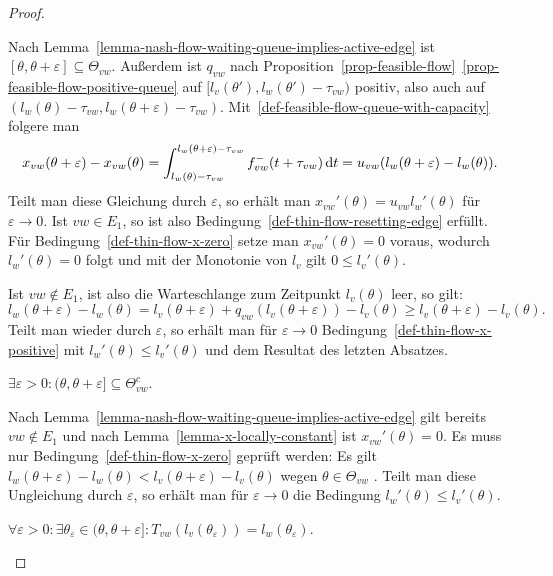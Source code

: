 \begin{proof}
\begin{description}[leftmargin=0cm, topsep=0cm, itemindent=0.5cm]
		Nach Lemma~\ref{lemma-nash-flow-waiting-queue-implies-active-edge} ist $[\theta,\theta+\varepsilon]\subseteq \Theta_{vw}$.
		Außerdem ist $q_{vw}$ nach Proposition~\ref{prop-feasible-flow}~\ref{prop-feasible-flow-positive-queue} auf $[ l_v(\theta') , l_w(\theta') - \tau_{vw} )$ positiv, also auch auf $( l_w(\theta)-\tau_{vw} , l_w(\theta + \varepsilon) - \tau_{vw} )$.
		Mit~\ref{def-feasible-flow-queue-with-capacity} folgere man
		\[ x_{vw}(\theta + \varepsilon) - x_{vw}(\theta) = \int_{l_w(\theta)-\tau_{vw}}^{l_w(\theta + \varepsilon)-\tau_{vw}} f_{vw}^-(t+\tau_{vw}) \mathop{}\!\mathrm{d} t
		= u_{vw} (l_w(\theta + \varepsilon) - l_w(\theta)).\]
		Teilt man diese Gleichung durch $\varepsilon$, so erhält man $x_{vw}'(\theta) = u_{vw} l_w'(\theta)$ für $\varepsilon\rightarrow 0$.
		Ist $vw\in E_1$, so ist also Bedingung~\ref{def-thin-flow-resetting-edge} erfüllt.
		Für Bedingung~\ref{def-thin-flow-x-zero} setze man $x_{vw}'(\theta)=0$ voraus, wodurch $l_w'(\theta)=0$ folgt und mit der Monotonie von $l_v$ gilt $0 \leq l_v'(\theta)$.
		
		Ist $vw\notin E_1$, ist also die Warteschlange zum Zeitpunkt $l_v(\theta)$ leer, so gilt: 
		\[ 
		l_w(\theta+\varepsilon) - l_w(\theta) = l_v(\theta + \varepsilon) + q_{vw}(l_v(\theta + \varepsilon)) - l_v(\theta) \geq l_v(\theta + \varepsilon) - l_v(\theta).
		\]
		Teilt man wieder durch $\varepsilon$, so erhält man für $\varepsilon \rightarrow 0$ Bedingung~\ref{def-thin-flow-x-positive} mit $l_w'(\theta) \leq l_v'(\theta)$ und dem Resultat des letzten Absatzes.
		
		\item[2. Fall:] $\exists \varepsilon > 0: (\theta, \theta + \varepsilon] \subseteq \Theta_{vw}^c$.
		
		Nach Lemma~\ref{lemma-nash-flow-waiting-queue-implies-active-edge} gilt bereits $vw\notin E_1$ und nach Lemma~\ref{lemma-x-locally-constant} ist $x_{vw}'(\theta) = 0$. 
		Es muss nur Bedingung~\ref{def-thin-flow-x-zero} geprüft werden:
		Es gilt $l_w(\theta + \varepsilon) - l_w(\theta) < l_v(\theta + \varepsilon) - l_v(\theta)$ wegen $\theta\in\Theta_{vw}$ .
		Teilt man diese Ungleichung durch $\varepsilon$, so erhält man für $\varepsilon\rightarrow 0$ die Bedingung $l_w'(\theta)\leq l_v'(\theta)$.
		
		\item[3. Fall:] $\forall \varepsilon>0: \exists \theta_{\varepsilon}\in (\theta, \theta+\varepsilon]: T_{vw}(l_v(\theta_\varepsilon)) = l_w(\theta_\varepsilon)$.
		

\end{description}
\end{proof}
